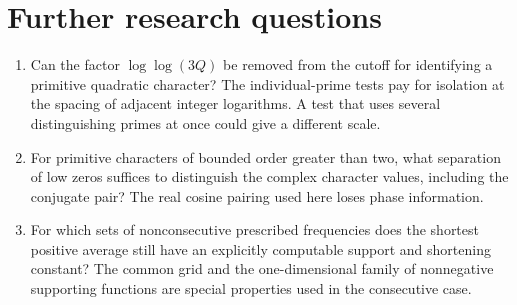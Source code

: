 \documentclass[11pt,letterpaper]{article}
\theoremstyle{remark}\newtheorem{remark}[theorem]{Remark}
\begin{document}
\section*{Further research questions}
\begin{enumerate}
\item Can the factor $\log\log(3Q)$ be removed from the cutoff for identifying a primitive quadratic character? The individual-prime tests pay for isolation at the spacing of adjacent integer logarithms. A test that uses several distinguishing primes at once could give a different scale.
\item For primitive characters of bounded order greater than two, what separation of low zeros suffices to distinguish the complex character values, including the conjugate pair? The real cosine pairing used here loses phase information.
\item For which sets of nonconsecutive prescribed frequencies does the shortest positive average still have an explicitly computable support and shortening constant? The common grid and the one-dimensional family of nonnegative supporting functions are special properties used in the consecutive case.
\end{enumerate}
\end{document}
